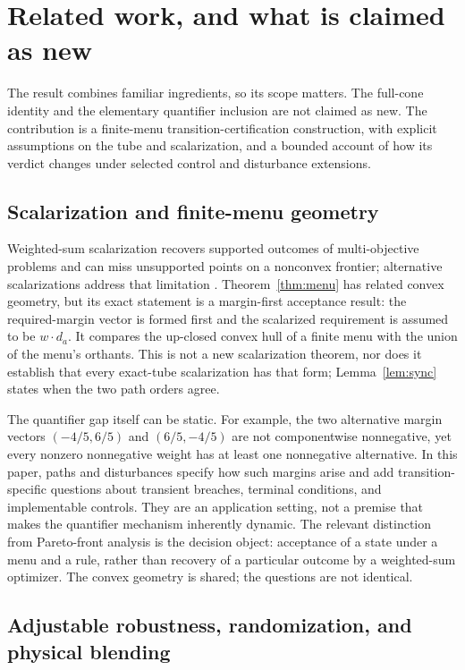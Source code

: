 \section{Related work, and what is claimed as new}\label{sec:related}

The result combines familiar ingredients, so its scope matters. The full-cone identity and the elementary quantifier inclusion are not claimed as new. The contribution is a finite-menu transition-certification construction, with explicit assumptions on the tube and scalarization, and a bounded account of how its verdict changes under selected control and disturbance extensions.

\subsection{Scalarization and finite-menu geometry}

Weighted-sum scalarization recovers supported outcomes of multi-objective problems and can miss unsupported points on a nonconvex frontier; alternative scalarizations address that limitation \citep{Koski1985,AthanPapalambros1996,DasDennis1997,Miettinen1999,Ehrgott2005,MessacMattson2002}. Theorem~\ref{thm:menu} has related convex geometry, but its exact statement is a margin-first acceptance result: the required-margin vector is formed first and the scalarized requirement is assumed to be $w\cdot d_a$. It compares the up-closed convex hull of a finite menu with the union of the menu's orthants. This is not a new scalarization theorem, nor does it establish that every exact-tube scalarization has that form; Lemma~\ref{lem:sync} states when the two path orders agree.

The quantifier gap itself can be static. For example, the two alternative margin vectors $(-4/5,6/5)$ and $(6/5,-4/5)$ are not componentwise nonnegative, yet every nonzero nonnegative weight has at least one nonnegative alternative. In this paper, paths and disturbances specify how such margins arise and add transition-specific questions about transient breaches, terminal conditions, and implementable controls. They are an application setting, not a premise that makes the quantifier mechanism inherently dynamic. The relevant distinction from Pareto-front analysis is the decision object: acceptance of a state under a menu and a rule, rather than recovery of a particular outcome by a weighted-sum optimizer. The convex geometry is shared; the questions are not identical.

\subsection{Adjustable robustness, randomization, and physical blending}


